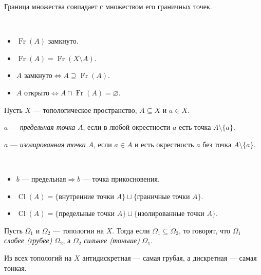 \documentclass[12pt,a4paper]{article}
\DeclareMathOperator{\Cl}{Cl}
\DeclareMathOperator{\Fr}{Fr}
\begin{document}
    \begin{theorem}
        Граница множества совпадает с множеством его граничных точек.
    \end{theorem}

    \begin{theorem}\ 
        \begin{itemize}
            \item $\Fr(A)$ замкнуто.
            \item $\Fr(A) = \Fr(X \setminus A)$.
            \item $A\text{ замкнуто} \Leftrightarrow A \supseteq \Fr(A)$.
            \item $A\text{ открыто} \Leftrightarrow A \cap \Fr(A) = \varnothing$.
        \end{itemize}
    \end{theorem}

    \begin{definition}
        Пусть $X$ --- топологическое пространство, $A \subseteq X$ и $a \in X$.

        $a$ --- \emph{предельная точка} $A$, если в любой окрестности $a$ есть точка $A \setminus \{a\}$.

        $a$ --- \emph{изолированная точка} $A$, если $a \in A$ и есть окрестность $a$ без точка $A \setminus \{a\}$.
    \end{definition}

    \begin{theorem}\ 
        \begin{itemize}
            \item $b\text{ --- предельная} \Rightarrow b\text{ --- точка прикосновения}$.
            \item $\Cl(A) = \{\text{внутренние точки $A$}\} \sqcup \{\text{граничные точки $A$}\}$.
            \item $\Cl(A) = \{\text{предельные точки $A$}\} \sqcup \{\text{изолированные точки $A$}\}$.
        \end{itemize}
    \end{theorem}

    \begin{definition}
        Пусть $\Omega_1$ и $\Omega_2$ --- топологии на $X$. Тогда если $\Omega_1 \subseteq \Omega_2$, то говорят, что $\Omega_1$ \emph{слабее (грубее)} $\Omega_2$, а $\Omega_2$ \emph{сильнее (тоньше)} $\Omega_1$.
    \end{definition}

    \begin{example}
        Из всех топологий на $X$ антидискретная --- самая грубая, а дискретная --- самая тонкая.
    \end{example}
\end{document}
